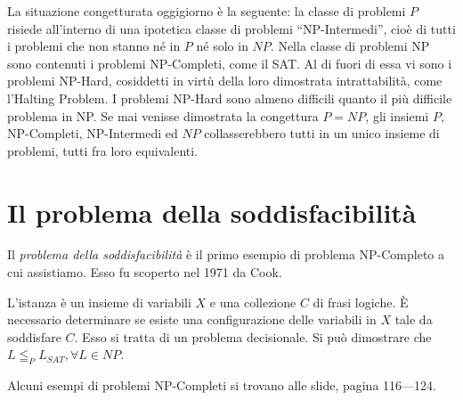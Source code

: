 \documentclass[10pt]{\classname}
\theoremstyle{newlinethm}
\theoremstyle{theorem}
\theoremstyle{definition}
\theoremstyle{definition}
\theoremstyle{definition}
\theoremstyle{definition}
\begin{document}
La situazione congetturata oggigiorno è la seguente: la classe di problemi $P$ risiede all'interno di una ipotetica classe di problemi ``NP-Intermedi'', cioè di tutti i problemi che non stanno né in $P$ né solo in $NP$. Nella classe di problemi NP sono contenuti i problemi NP-Completi, come il SAT. Al di fuori di essa vi sono i problemi NP-Hard, cosiddetti in virtù della loro dimostrata intrattabilità, come l'Halting Problem. I problemi NP-Hard sono almeno difficili quanto il più difficile problema in NP. Se mai venisse dimostrata la congettura $P = NP$, gli insiemi $P$, NP-Completi, NP-Intermedi ed $NP$ collasserebbero tutti in un unico insieme di problemi, tutti fra loro equivalenti.

\section{Il problema della soddisfacibilità}

Il \emph{problema della soddisfacibilità} è il primo esempio di problema NP-Completo a cui assistiamo. Esso fu scoperto nel 1971 da Cook.

L'istanza è un insieme di variabili $X$ e una collezione $C$ di frasi logiche. È necessario determinare se esiste una configurazione delle variabili in $X$ tale da soddisfare $C$. Esso si tratta di un problema decisionale. Si può dimostrare che $L\leqq_P L_{SAT}, \forall L \in NP$.

Alcuni esempi di problemi NP-Completi si trovano alle slide, pagina 116---124.
\end{document}
